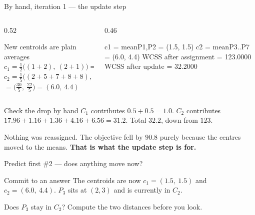 \documentclass[aspectratio=169]{beamer}
\begin{document}
\begin{frame}[fragile,shrink=8]{By hand, iteration 1 --- the update step}
  \begin{columns}[T]
    \begin{column}{0.52\textwidth}
      \begin{block}{New centroids are plain averages}
        \small
        $c_1 = \frac12\bigl((1{+}2),\ (2{+}1)\bigr) = (1.5,\ 1.5)$
        \\[0.3em]
        $c_2 = \frac15\bigl((2{+}5{+}7{+}8{+}8),\ (3{+}4{+}5{+}4{+}6)\bigr)$
        \\ \hspace{1.1em} $= \bigl(\tfrac{30}{5},\ \tfrac{22}{5}\bigr)
           = (6.0,\ 4.4)$
      \end{block}
    \end{column}
    \begin{column}{0.46\textwidth}
\begin{outblk}
  c1 = mean{P1,P2}       = (1.5, 1.5)
  c2 = mean{P3..P7}      = (6.0, 4.4)
  WCSS after assignment  = 123.0000
  WCSS after update      =  32.2000
\end{outblk}
    \end{column}
  \end{columns}
  \vspace{0.3em}
  \begin{exampleblock}{Check the drop by hand}
    \centering\small
    $C_1$ contributes $0.5 + 0.5 = 1.0$. $C_2$ contributes
    $17.96 + 1.16 + 1.36 + 4.16 + 6.56 = 31.2$. Total
    $\mathbf{32.2}$, down from $123$.
  \end{exampleblock}
  \begin{alertblock}{}
    \centering\small
    Nothing was reassigned. The objective fell by $90.8$ purely because the
    centres moved to the means. \textbf{That is what the update step is for.}
  \end{alertblock}
\end{frame}

\begin{frame}{Predict first \#2 --- does anything move now?}
  \begin{alertblock}{Commit to an answer}
    The centroids are now $c_1 = (1.5,\ 1.5)$ and $c_2 = (6.0,\ 4.4)$.
    $P_3$ sits at $(2,3)$ and is currently in $C_2$.

    \medskip
    \centering\large
    Does $P_3$ stay in $C_2$? Compute the two distances before you look.
  \end{alertblock}
\end{frame}
\end{document}
